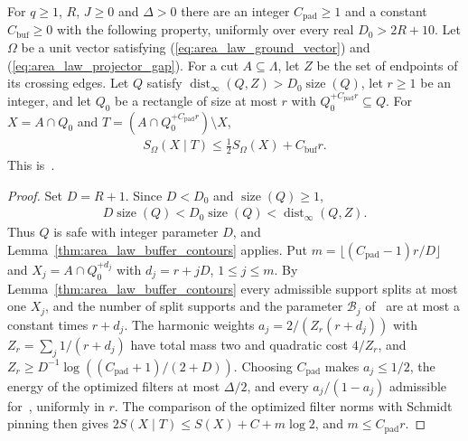 \begin{lemma}
    \label{thm:area_law_initial_buffer}
    \leanok
    For $q\ge1$, $R$, $J\ge0$ and $\Delta>0$ there are an integer
    $C_{\mathrm{pad}}\ge1$ and a constant $C_{\mathrm{buf}}\ge0$ with the following
    property, uniformly over every real $D_0>2R+10$.
    Let $\Omega$ be a unit vector satisfying
    (\ref{eq:area_law_ground_vector}) and (\ref{eq:area_law_projector_gap}).
    For a cut $A\subseteq\Lambda$, let $Z$ be the set of endpoints of its crossing edges.
    Let $Q$ satisfy $\operatorname{dist}_\infty(Q,Z)>D_0\operatorname{size}(Q)$,
    let $r\ge1$ be an integer, and let $Q_0$ be a rectangle of size at most $r$
    with $Q_0^{+C_{\mathrm{pad}}r}\subseteq Q$. For $X=A\cap Q_0$ and
    $T=(A\cap Q_0^{+C_{\mathrm{pad}}r})\setminus X$,
    \begin{align}
        S_\Omega(X\mid T)\le\frac12S_\Omega(X)+C_{\mathrm{buf}}r.
    \end{align}
    This is~\cite[Lemma~3.2]{OpenAI2026AreaLaw}.
\end{lemma}
\begin{proof}\leanok
    Set $D=R+1$. Since $D<D_0$ and $\operatorname{size}(Q)\ge1$,
    \begin{align}
        D\operatorname{size}(Q)<D_0\operatorname{size}(Q)
        <\operatorname{dist}_\infty(Q,Z).
    \end{align}
    Thus $Q$ is safe with integer parameter $D$, and
    Lemma~\ref{thm:area_law_buffer_contours} applies.
    Put $m=\lfloor(C_{\mathrm{pad}}-1)r/D\rfloor$ and
    $X_j=A\cap Q_0^{+d_j}$ with $d_j=r+jD$, $1\le j\le m$. By
    Lemma~\ref{thm:area_law_buffer_contours} every admissible support splits
    at most one $X_j$, and the number of split supports and the parameter
    $\mathcal B_j$ of~\cite[Lemma~3.1]{OpenAI2026AreaLaw} are at most a constant times $r+d_j$. The
    harmonic weights $a_j=2/(Z_r(r+d_j))$ with $Z_r=\sum_j1/(r+d_j)$ have total
    mass two and quadratic cost $4/Z_r$, and
    $Z_r\ge D^{-1}\log((C_{\mathrm{pad}}+1)/(2+D))$. Choosing
    $C_{\mathrm{pad}}$ makes $a_j\le1/2$, the energy of the optimized filters
    at most $\Delta/2$, and every $a_j/(1-a_j)$ admissible for~\cite[Lemma~3.1]{OpenAI2026AreaLaw},
    uniformly in $r$. The comparison of the optimized filter norms with
    Schmidt pinning then gives
    $2S(X\mid T)\le S(X)+C+m\log2$, and $m\le C_{\mathrm{pad}}r$.
\end{proof}
